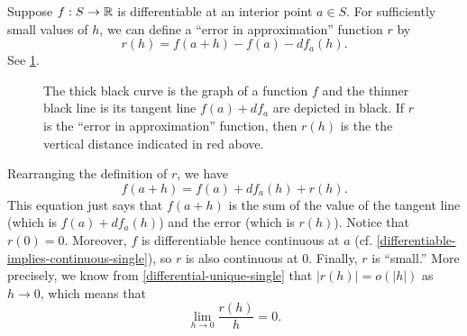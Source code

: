 \begin{remark} \label{error-in-approximation}
	Suppose $f : S \to \mathbb{R}$ is differentiable at an interior point $a \in S$. For sufficiently small values of $h$, we can define a ``error in approximation'' function $r$ by
	\[ r(h) = f(a+h) - f(a) - df_a(h). \]
	See \cref{figure-error-in-approximation}. 
	\begin{figure}
		\begin{center}
		\end{center}
		\caption{The thick black curve is the graph of a function $f$ and the thinner black line is its tangent line $f(a) + df_a$ are depicted in black. If $r$ is the ``error in approximation'' function, then $r(h)$ is the the vertical distance indicated in red above.}  \label{figure-error-in-approximation}
	\end{figure}
	Rearranging the definition of $r$, we have
	\[ f(a+h) = f(a) + df_a(h) + r(h). \]
	This equation just says that $f(a+h)$ is the sum of the value of the tangent line (which is $f(a) + df_a(h)$) and the error (which is $r(h)$). Notice that $r(0) = 0$. Moreover, $f$ is differentiable hence continuous at $a$ (cf. \cref{differentiable-implies-continuous-single}), so $r$ is also  continuous at 0. Finally, $r$ is ``small.'' More precisely, we know from \cref{differential-unique-single} that $|r(h)| = o(|h|)$ as $h \to 0$, which means that
	\[ \lim_{h \to 0} \frac{r(h)}{h} = 0. \]
\end{remark} 

